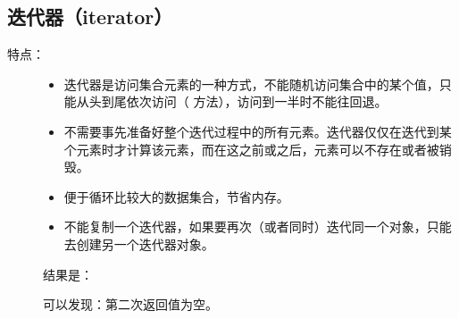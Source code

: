 \documentclass[letterpaper,10pt,english]{sphinxmanual}
\begin{document}
\subsection{迭代器（iterator）}
\label{\detokenize{python/05_iterator:iterator}}\begin{description}
\item[{特点：}] \leavevmode\begin{itemize}
\item {} 
迭代器是访问集合元素的一种方式，不能随机访问集合中的某个值，只能从头到尾依次访问（  方法），访问到一半时不能往回退。

\item {} 
不需要事先准备好整个迭代过程中的所有元素。迭代器仅仅在迭代到某个元素时才计算该元素，而在这之前或之后，元素可以不存在或者被销毁。

\item {} 
便于循环比较大的数据集合，节省内存。

\item {} 
不能复制一个迭代器，如果要再次（或者同时）迭代同一个对象，只能去创建另一个迭代器对象。

\end{itemize}

%
\begin{sphinxVerbatim}[commandchars=\\\{\},numbers=left,firstnumber=1,stepnumber=1]
  \PYG{p}{[}\PYG{p}{]}

    
        
          
     
\end{sphinxVerbatim}

结果是：

%
\begin{sphinxVerbatim}[commandchars=\\\{\}]
 
 
\end{sphinxVerbatim}

可以发现：第二次返回值为空。

\end{description}
\end{document}
